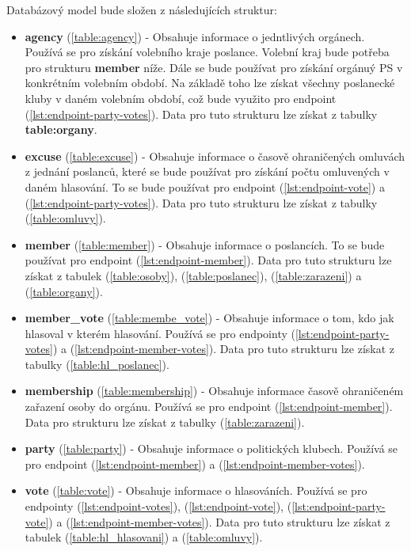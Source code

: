Databázový model bude složen z následujících struktur:

\begin{itemize}
	\item \textbf{agency} (\ref{table:agency}) - Obsahuje informace o jedntlivých orgánech. Používá se pro získání volebního kraje poslance. Volební kraj bude potřeba pro strukturu \textbf{member} níže. Dále se bude používat pro získání orgánuý PS v konkrétním volebním období. Na základě toho lze získat všechny poslanecké kluby v daném volebním období, což bude využito pro endpoint (\ref{lst:endpoint-party-votes}). Data pro tuto strukturu lze získat z tabulky \textbf{table:organy}.
	

	\item \textbf{excuse} (\ref{table:excuse}) - Obsahuje informace o časově ohraničených omluvách z jednání poslanců, které se bude používat pro získání počtu omluvených v daném hlasování. To se bude používat pro endpoint (\ref{lst:endpoint-vote}) a (\ref{lst:endpoint-party-votes}). Data pro tuto strukturu lze získat z tabulky (\ref{table:omluvy}).
	
	\item \textbf{member} (\ref{table:member}) - Obsahuje informace o poslancích. To se bude používat pro endpoint (\ref{lst:endpoint-member}). Data pro tuto strukturu lze získat z tabulek (\ref{table:osoby}), (\ref{table:poslanec}), (\ref{table:zarazeni}) a (\ref{table:organy}).
	
	\item \textbf{member\_vote} (\ref{table:membe_vote}) - Obsahuje informace o tom, kdo jak hlasoval v kterém hlasování. Používá  se pro endpointy (\ref{lst:endpoint-party-votes}) a (\ref{lst:endpoint-member-votes}). Data pro tuto strukturu lze získat z tabulky (\ref{table:hl_poslanec}).
	
	\item \textbf{membership} (\ref{table:membership}) - Obsahuje informace časově ohraničeném zařazení osoby do orgánu. Používá se pro endpoint (\ref{lst:endpoint-member}). Data pro strukturu lze získat z tabulky (\ref{table:zarazeni}).
	
	\item \textbf{party} (\ref{table:party}) - Obsahuje informace o politických klubech. Používá se pro endpoint (\ref{lst:endpoint-member}) a (\ref{lst:endpoint-member-votes}).
	
	\item \textbf{vote} (\ref{table:vote}) - Obsahuje informace o hlasováních. Používá se pro endpointy (\ref{lst:endpoint-votes}), (\ref{lst:endpoint-vote}), (\ref{lst:endpoint-party-vote}) a (\ref{lst:endpoint-member-votes}). Data pro tuto strukturu lze získat z tabulek (\ref{table:hl_hlasovani}) a (\ref{table:omluvy}).

\end{itemize}

